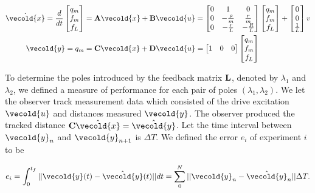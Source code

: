 \documentclass[11pt,titlepage]{report}
\let\vec\vecold
\newcommand{\vec}[1]{\mathbf{#1}}
\begin{document}
\begin{align} \label{eq:ctrl-bond-model}
	\dot{\vec{x}} = \frac{d}{dt}
	\begin{bmatrix}
		q_m \\
		f_m \\
		f_L
	\end{bmatrix} &= \mat{A} \vec{x} + \mat{B} \vec{u} =
	\begin{bmatrix}
		0 & 1 & 0 \\
		0 & -\frac{\rho}{m} & \frac{r}{m} \\
		0 & -\frac{r}{L} & -\frac{R}{L}
	\end{bmatrix}
	\begin{bmatrix}
		q_m \\
		f_m \\
		f_L
	\end{bmatrix} +
	\begin{bmatrix}
		0 \\
		0 \\
		\frac{1}{L}
	\end{bmatrix} v \\
	\vec{y} = q_m &= \mat{C} \vec{x} + \mat{D} \vec{u} =
	\begin{bmatrix}
		1 & 0 & 0
	\end{bmatrix}
	\begin{bmatrix}
		q_m \\
		f_m \\
		f_L
	\end{bmatrix}
\end{align}

To determine the poles introduced by the feedback matrix $\mathbf{L}$, denoted by $\lambda_1$ and $\lambda_2$, we defined a measure of performance for each pair of poles $(\lambda_1,\lambda_2)$. We let the observer track measurement data which consisted of the drive excitation $\vec{u}$ and distances measured $\vec{y}$. The observer produced the tracked distance $\mat{C} \hat{\vec{x}} = \hat{\vec{y}}$. Let the time interval between $\vec{y}_n$ and $\vec{y}_{n+1}$ is $\Delta T$. We defined the error $e_i$ of experiment $i$ to be

\begin{equation*} \label{ctrl:err}
	e_i = \int_{0}^{t_f} || \vec{y}(t) - \hat{\vec{y}}(t) || dt = \sum_{0}^{N} ||\vec{y}_n - \hat{\vec{y}}_n || \Delta T.
\end{equation*}
\end{document}
